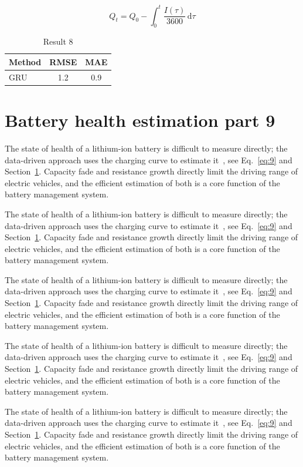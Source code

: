 \documentclass[11pt]{article}
\begin{document}
\begin{equation}\label{eq:8}
  Q_t = Q_0 - \int_0^t \frac{I(\tau)}{3600}\,\mathrm{d}\tau
\end{equation}
\begin{table}[h]\centering\begin{tabular}{lcc}\toprule Method & RMSE & MAE\\\midrule GRU & 1.2 & 0.9\\\bottomrule\end{tabular}\caption{Result 8}\end{table}

\section{Battery health estimation part 9}\label{sec:9}
The state of health of a lithium-ion battery is difficult to measure directly; the data-driven approach uses the charging curve to estimate it~\cite{a2020}, see Eq.~\eqref{eq:9} and Section~\ref{sec:9}. Capacity fade and resistance growth directly limit the driving range of electric vehicles, and the efficient estimation of both is a core function of the battery management system.

The state of health of a lithium-ion battery is difficult to measure directly; the data-driven approach uses the charging curve to estimate it~\cite{a2020}, see Eq.~\eqref{eq:9} and Section~\ref{sec:9}. Capacity fade and resistance growth directly limit the driving range of electric vehicles, and the efficient estimation of both is a core function of the battery management system.

The state of health of a lithium-ion battery is difficult to measure directly; the data-driven approach uses the charging curve to estimate it~\cite{a2020}, see Eq.~\eqref{eq:9} and Section~\ref{sec:9}. Capacity fade and resistance growth directly limit the driving range of electric vehicles, and the efficient estimation of both is a core function of the battery management system.

The state of health of a lithium-ion battery is difficult to measure directly; the data-driven approach uses the charging curve to estimate it~\cite{a2020}, see Eq.~\eqref{eq:9} and Section~\ref{sec:9}. Capacity fade and resistance growth directly limit the driving range of electric vehicles, and the efficient estimation of both is a core function of the battery management system.

The state of health of a lithium-ion battery is difficult to measure directly; the data-driven approach uses the charging curve to estimate it~\cite{a2020}, see Eq.~\eqref{eq:9} and Section~\ref{sec:9}. Capacity fade and resistance growth directly limit the driving range of electric vehicles, and the efficient estimation of both is a core function of the battery management system.
\end{document}
